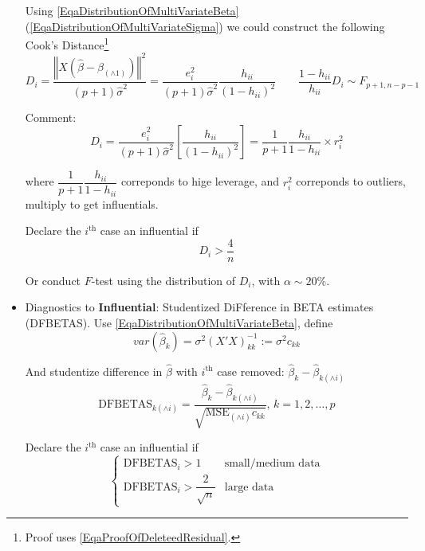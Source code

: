 \begin{itemize}[topsep=2pt,itemsep=0pt]
    Using \autoref{EqaDistributionOfMultiVariateBeta}(\autoref{EqaDistributionOfMultiVariateSigma}) we could construct the following Cook's Distance\footnote{Proof uses \autoref{EqaProofOfDeleteedResidual}.}
    \begin{equation}
         D_i=\dfrac{\left\Vert X(\hat{\beta} -\hat{\beta }_{(\wedge 1)})\right\Vert ^2}{(p+1)\hat{\sigma }^2}=\dfrac{e_i^2}{(p+1)\hat{\sigma }^2}\dfrac{h_{ii}}{(1-h_{ii})^2}\qquad \dfrac{1-h_{ii}}{h_{ii}}D_i\sim F_{p+1,n-p-1}
    \end{equation}
    
    Comment:
    \begin{equation}
        D_i=\dfrac{e_i^2}{(p+1)\hat{\sigma }^2}\left[ \dfrac{h_{ii}}{(1-h_{ii})^2} \right]=\dfrac{1}{p+1}\dfrac{h_{ii}}{1-h_{ii}}\times r_i^2
    \end{equation}

   where $ \dfrac{1}{p+1}\dfrac{h_{ii}}{1-h_{ii}} $ correponds to hige leverage, and $ r_{i}^2 $ correponds to outliers, multiply to get influentials.

   Declare the $ i^\mathrm{th}  $ case an {influential} if 
   \begin{equation}
       D_i>\dfrac{4}{n}
   \end{equation}
   
   Or conduct $ F $-test using the distribution of $ D_i $, with $ \alpha \sim 20\% $. 

   \item Diagnostics to \textbf{Influential}: Studentized DiFference in BETA estimates (DFBETAS). Use \autoref{EqaDistributionOfMultiVariateBeta}, define
   \begin{equation}
       var(\hat{\beta }_k)=\sigma ^2(X'X)^{-1}_{kk}:=\sigma ^2c_{kk} 
   \end{equation}
   
   And studentize difference in $ \hat{\beta } $ with $ i^\mathrm{th} $ case removed: $ \hat{\beta }_k-\hat{\beta }_{k(\wedge i)} $
   \begin{equation}
       \mathrm{DFBETAS}_{k(\wedge i)}=\dfrac{\hat{\beta }_k-\hat{\beta }_{k(\wedge i)}}{\sqrt{\mathrm{MSE}_{(\wedge i)}c_{kk} }},\,k=1,2,\ldots, p
   \end{equation}
   
   Declare the $ i^\mathrm{th}  $ case an {influential} if 
   \begin{equation}
    \begin{cases}
        \mathrm{DFBETAS}_i>1&\text{small/medium data} \\
        \mathrm{DFBETAS}_i>\dfrac{2}{\sqrt{n}}&\text{large data}
    \end{cases}   
   \end{equation}
   
   
   
   

\end{itemize}

